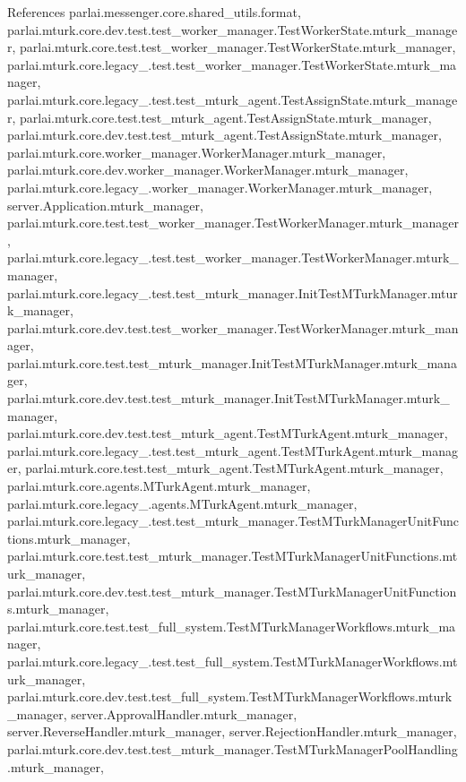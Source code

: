 References parlai.\+messenger.\+core.\+shared\+\_\+utils.\+format, parlai.\+mturk.\+core.\+dev.\+test.\+test\+\_\+worker\+\_\+manager.\+Test\+Worker\+State.\+mturk\+\_\+manager, parlai.\+mturk.\+core.\+test.\+test\+\_\+worker\+\_\+manager.\+Test\+Worker\+State.\+mturk\+\_\+manager, parlai.\+mturk.\+core.\+legacy\+\_.\+test.\+test\+\_\+worker\+\_\+manager.\+Test\+Worker\+State.\+mturk\+\_\+manager, parlai.\+mturk.\+core.\+legacy\+\_.\+test.\+test\+\_\+mturk\+\_\+agent.\+Test\+Assign\+State.\+mturk\+\_\+manager, parlai.\+mturk.\+core.\+test.\+test\+\_\+mturk\+\_\+agent.\+Test\+Assign\+State.\+mturk\+\_\+manager, parlai.\+mturk.\+core.\+dev.\+test.\+test\+\_\+mturk\+\_\+agent.\+Test\+Assign\+State.\+mturk\+\_\+manager, parlai.\+mturk.\+core.\+worker\+\_\+manager.\+Worker\+Manager.\+mturk\+\_\+manager, parlai.\+mturk.\+core.\+dev.\+worker\+\_\+manager.\+Worker\+Manager.\+mturk\+\_\+manager, parlai.\+mturk.\+core.\+legacy\+\_.\+worker\+\_\+manager.\+Worker\+Manager.\+mturk\+\_\+manager, server.\+Application.\+mturk\+\_\+manager, parlai.\+mturk.\+core.\+test.\+test\+\_\+worker\+\_\+manager.\+Test\+Worker\+Manager.\+mturk\+\_\+manager, parlai.\+mturk.\+core.\+legacy\+\_.\+test.\+test\+\_\+worker\+\_\+manager.\+Test\+Worker\+Manager.\+mturk\+\_\+manager, parlai.\+mturk.\+core.\+legacy\+\_.\+test.\+test\+\_\+mturk\+\_\+manager.\+Init\+Test\+M\+Turk\+Manager.\+mturk\+\_\+manager, parlai.\+mturk.\+core.\+dev.\+test.\+test\+\_\+worker\+\_\+manager.\+Test\+Worker\+Manager.\+mturk\+\_\+manager, parlai.\+mturk.\+core.\+test.\+test\+\_\+mturk\+\_\+manager.\+Init\+Test\+M\+Turk\+Manager.\+mturk\+\_\+manager, parlai.\+mturk.\+core.\+dev.\+test.\+test\+\_\+mturk\+\_\+manager.\+Init\+Test\+M\+Turk\+Manager.\+mturk\+\_\+manager, parlai.\+mturk.\+core.\+dev.\+test.\+test\+\_\+mturk\+\_\+agent.\+Test\+M\+Turk\+Agent.\+mturk\+\_\+manager, parlai.\+mturk.\+core.\+legacy\+\_.\+test.\+test\+\_\+mturk\+\_\+agent.\+Test\+M\+Turk\+Agent.\+mturk\+\_\+manager, parlai.\+mturk.\+core.\+test.\+test\+\_\+mturk\+\_\+agent.\+Test\+M\+Turk\+Agent.\+mturk\+\_\+manager, parlai.\+mturk.\+core.\+agents.\+M\+Turk\+Agent.\+mturk\+\_\+manager, parlai.\+mturk.\+core.\+legacy\+\_.\+agents.\+M\+Turk\+Agent.\+mturk\+\_\+manager, parlai.\+mturk.\+core.\+legacy\+\_.\+test.\+test\+\_\+mturk\+\_\+manager.\+Test\+M\+Turk\+Manager\+Unit\+Functions.\+mturk\+\_\+manager, parlai.\+mturk.\+core.\+test.\+test\+\_\+mturk\+\_\+manager.\+Test\+M\+Turk\+Manager\+Unit\+Functions.\+mturk\+\_\+manager, parlai.\+mturk.\+core.\+dev.\+test.\+test\+\_\+mturk\+\_\+manager.\+Test\+M\+Turk\+Manager\+Unit\+Functions.\+mturk\+\_\+manager, parlai.\+mturk.\+core.\+test.\+test\+\_\+full\+\_\+system.\+Test\+M\+Turk\+Manager\+Workflows.\+mturk\+\_\+manager, parlai.\+mturk.\+core.\+legacy\+\_.\+test.\+test\+\_\+full\+\_\+system.\+Test\+M\+Turk\+Manager\+Workflows.\+mturk\+\_\+manager, parlai.\+mturk.\+core.\+dev.\+test.\+test\+\_\+full\+\_\+system.\+Test\+M\+Turk\+Manager\+Workflows.\+mturk\+\_\+manager, server.\+Approval\+Handler.\+mturk\+\_\+manager, server.\+Reverse\+Handler.\+mturk\+\_\+manager, server.\+Rejection\+Handler.\+mturk\+\_\+manager, parlai.\+mturk.\+core.\+dev.\+test.\+test\+\_\+mturk\+\_\+manager.\+Test\+M\+Turk\+Manager\+Pool\+Handling.\+mturk\+\_\+manager, 